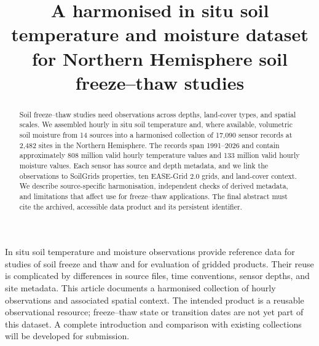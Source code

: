 \documentclass[essd,manuscript]{copernicus}
\begin{document}
\title{A harmonised in situ soil temperature and moisture dataset for Northern Hemisphere soil freeze--thaw studies}




\received{}
\pubdiscuss{}
\revised{}
\accepted{}
\published{}

\maketitle

\begin{abstract}
Soil freeze--thaw studies need observations across depths, land-cover types,
and spatial scales. We assembled hourly in situ soil temperature and, where
available, volumetric soil moisture from 14 sources into a harmonised collection
of 17,090 sensor records at 2,482 sites in the Northern Hemisphere. The records
span 1991--2026 and contain approximately 808 million valid hourly temperature
values and 133 million valid hourly moisture values. Each sensor has source and
depth metadata, and we link the observations to SoilGrids properties, ten
EASE-Grid 2.0 grids, and land-cover context. We describe source-specific
harmonisation, independent checks of derived metadata, and limitations that
affect use for freeze--thaw applications. The final abstract must cite the
archived, accessible data product and its persistent identifier.
\end{abstract}

\introduction
In situ soil temperature and moisture observations provide reference data for
studies of soil freeze and thaw and for evaluation of gridded products. Their
reuse is complicated by differences in source files, time conventions, sensor
depths, and site metadata. This article documents a harmonised collection of
hourly observations and associated spatial context. The intended product is a
reusable observational resource; freeze--thaw state or transition dates are
not yet part of this dataset. A complete introduction and comparison with
existing collections will be developed for submission.
\end{document}
